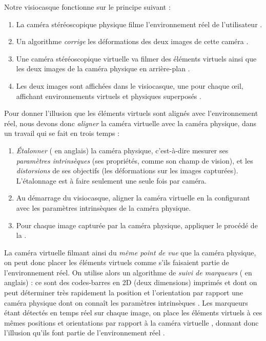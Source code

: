 Notre visiocasque fonctionne sur le principe suivant :
\begin{enumerate}
  \item La caméra stéréoscopique physique filme l'environnement réel de l'utilisateur .
  \item Un algorithme \emph{corrige} les déformations des deux images de cette caméra .
  \item Une caméra stéréoscopique virtuelle va filmer des éléments virtuels ainsi que les deux images de la caméra physique en arrière-plan .
  \item Les deux images sont affichées dans le visiocasque, une pour chaque \oe il, affichant environnements virtuels et physiques superposés .
\end{enumerate}
\bigskip
Pour donner l'illusion que les éléments virtuels sont alignés avec l'environnement réel, nous devons donc \emph{aligner} la caméra virtuelle avec la caméra physique, dans un travail qui se fait en trois temps :
\begin{enumerate}
  \item \emph{Étalonner} ( en anglais) la caméra physique, c'est-à-dire mesurer ses \emph{paramètres intrinsèques} (ses propriétés, comme son champ de vision), et les \emph{distorsions} de ses objectifs (les déformations sur les images capturées). L'étalonnage est à faire seulement une seule fois par caméra.
  \item Au démarrage du visiocasque, aligner la caméra virtuelle en la configurant avec les paramètres intrinsèques de la caméra physique.
  \item Pour chaque image capturée par la caméra physique, appliquer le procédé de la .
\end{enumerate}
\bigskip

La caméra virtuelle filmant ainsi du \emph{même point de vue} que la caméra physique, on peut donc placer les éléments virtuels comme s'ils faisaient partie de l'environnement réel. On utilise alors un algorithme de \emph{suivi de marqueurs} ( en anglais) : ce sont des codes-barres en 2D (deux dimensions) imprimés  et dont on peut déterminer très rapidement la position et l'orientation par rapport une caméra physique dont on connaît les paramètres intrinsèques \cite{Garrido-Jurado2014}. Les marqueurs étant détectés en temps réel sur chaque image, on place les éléments virtuels à ces mêmes positions et orientations par rapport à la caméra virtuelle , donnant donc l'illusion qu'ils font partie de l'environnement réel .

